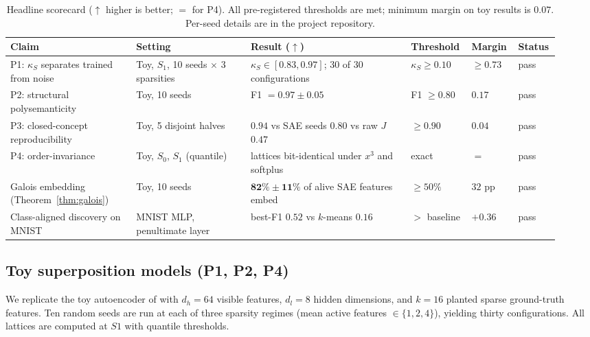 \documentclass[a4paper,fleqn]{cas-dc}
\newcommand{\Jirr}{J}
\newcommand{\kS}{\kappa_S}
\begin{document}
\begin{table}[t]
\caption{Headline scorecard ($\uparrow$ higher is better; $=$ for P4). All pre-registered thresholds are met; minimum margin on toy results is $0.07$. Per-seed details are in the project repository.}\label{tbl:scorecard}
\centering\small
\begin{tabular*}{\tblwidth}{@{}p{0.22\linewidth}p{0.20\linewidth}p{0.28\linewidth}p{0.10\linewidth}p{0.08\linewidth}p{0.05\linewidth}@{}}
\toprule
Claim & Setting & Result ($\uparrow$) & Threshold & Margin & Status \\
\midrule
P1: $\kS$ separates trained from noise & Toy, $S_1$, 10 seeds $\times$ 3 sparsities & $\kS \in [\mathbf{0.83}, \mathbf{0.97}]$; 30 of 30 configurations & $\kS \ge 0.10$ & $\ge 0.73$ & pass \\
P2: structural polysemanticity & Toy, 10 seeds & F1 $= \mathbf{0.97 \pm 0.05}$ & F1 $\ge 0.80$ & $0.17$ & pass \\
P3: closed-concept reproducibility & Toy, 5 disjoint halves & $\mathbf{0.94}$ vs SAE seeds $0.80$ vs raw $\Jirr$ $0.47$ & $\ge 0.90$ & $0.04$ & pass \\
P4: order-invariance & Toy, $S_0$, $S_1$ (quantile) & lattices bit-identical under $x^3$ and softplus & exact & $=$ & pass \\
Galois embedding (Theorem~\ref{thm:galois}) & Toy, 10 seeds & $\mathbf{82\% \pm 11\%}$ of alive SAE features embed & $\ge 50\%$ & $32$ pp & pass \\
Class-aligned discovery on MNIST & MNIST MLP, penultimate layer & best-F1 $\mathbf{0.52}$ vs $k$-means $0.16$ & $>$ baseline & $+0.36$ & pass \\
\bottomrule
\end{tabular*}
\end{table}

\subsection{Toy superposition models (P1, P2, P4)}\label{ssec:toy}

We replicate the toy autoencoder of \citet{elhage2022superposition} with $d_h = 64$ visible features, $d_l = 8$ hidden dimensions, and $k = 16$ planted sparse ground-truth features.
Ten random seeds are run at each of three sparsity regimes (mean active features $\in \{1, 2, 4\}$), yielding thirty configurations.
All lattices are computed at $S1$ with quantile thresholds.
\end{document}
